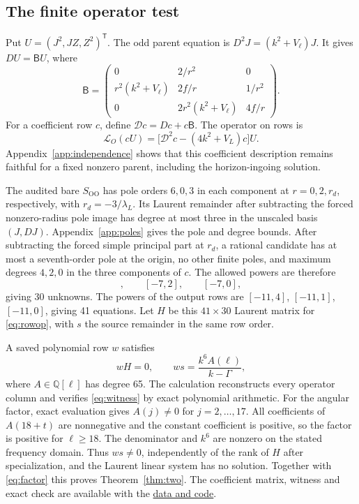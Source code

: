 \documentclass[11pt]{article}
\newcommand{\OO}{\mathrm{OO}}
\begin{document}
\subsection{The finite operator test}

Put \(U=(J^2,JZ,Z^2)^{\mathsf T}\).
The odd parent equation is \(D^2J=(k^2+V_\ell)J\).
It gives \(DU=\mathsf B U\), where
\begin{equation}
 \mathsf B=
 \begin{pmatrix}
 0&2/r^2&0\\
 r^2(k^2+V_\ell)&2f/r&1/r^2\\
 0&2r^2(k^2+V_\ell)&4f/r
 \end{pmatrix}.
 \label{eq:jet}
\end{equation}
For a coefficient row \(c\), define \(\mathcal D c=Dc+c\mathsf B\).
The operator on rows is
\begin{equation}
 \mathcal L_O(cU)
 =\big[\mathcal D^2c-(4k^2+V_L)c\big]U .
 \label{eq:rowop}
\end{equation}
Appendix~\ref{app:independence} shows that this coefficient description remains faithful for a fixed nonzero parent, including the horizon-ingoing solution.

The audited bare \(S_{\OO}\) has pole orders \(6,0,3\) in each component at \(r=0,2,r_d\), respectively, with \(r_d=-3/\lambda_L\).
Its Laurent remainder after subtracting the forced nonzero-radius pole image has degree at most three in the unscaled basis \((J,DJ)\).
Appendix~\ref{app:poles} gives the pole and degree bounds.
After subtracting the forced simple principal part at \(r_d\), a rational candidate has at most a seventh-order pole at the origin, no other finite poles, and maximum degrees \(4,2,0\) in the three components of \(c\).
The allowed powers are therefore
\begin{equation}
  [-7,4],\qquad [-7,2],\qquad [-7,0],
 \label{eq:cols}
\end{equation}
giving 30 unknowns.
The powers of the output rows are \([-11,4]\), \([-11,1]\), \([-11,0]\), giving 41 equations.
Let \(H\) be this \(41\times30\) Laurent matrix for \eqref{eq:rowop}, with \(s\) the source remainder in the same row order.

A saved polynomial row \(w\) satisfies
\begin{equation}
 wH=0,\qquad ws=\frac{k^6 A(\ell)}{k-\Gamma},
 \label{eq:witness}
\end{equation}
where \(A\in\mathbb Q[\ell]\) has degree 65.
The calculation reconstructs every operator column and verifies \eqref{eq:witness} by exact polynomial arithmetic.
For the angular factor, exact evaluation gives \(A(j)\ne0\) for \(j=2,\ldots,17\).
All coefficients of \(A(18+t)\) are nonnegative and the constant coefficient is positive, so the factor is positive for \(\ell\geq18\).
The denominator and \(k^6\) are nonzero on the stated frequency domain.
Thus \(ws\ne0\), independently of the rank of \(H\) after specialization, and the Laurent linear system has no solution.
Together with \eqref{eq:factor} this proves Theorem~\ref{thm:two}.
The coefficient matrix, witness and exact check are available with the \hyperref[sec:data]{data and code}.
\end{document}
